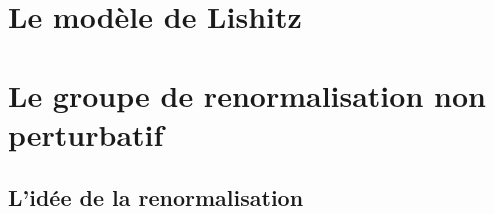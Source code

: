 \documentclass[xcolor=dvipsnames]{beamer}
\title[Étude du point de Lifshitz par le groupe de renormalisation.]{}
\date{Stage du 13 janvier au 7 mars 2014 au \\ 
\huge{Laboratoire de physique théorique de la matière condensée} \\ 
\small{UMPC}}
\author{Nicolas Macé\\ 
\textbf{Responsable de stage :} Dominique Mouhanna}
\begin{document}
\begin{frame}
\begin{titlepage}
\end{titlepage}
\end{frame}


\section{Le modèle de Lishitz}

\section{Le groupe de renormalisation non perturbatif}
\subsection{L'idée de la renormalisation}
\end{document}

